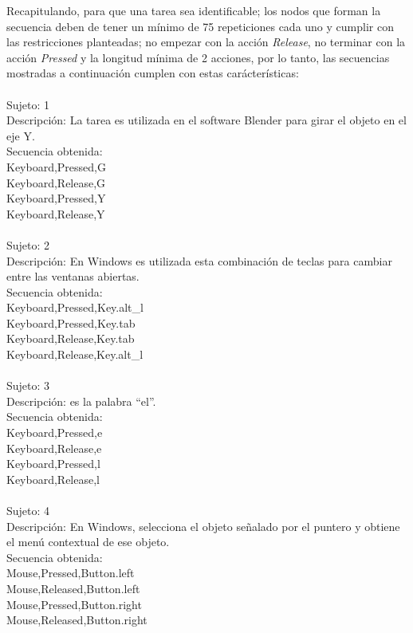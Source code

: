 Recapitulando, para que una tarea sea identificable; los nodos que forman la
 secuencia deben de tener un m\'inimo de 75 repeticiones cada uno y cumplir 
 con las restricciones planteadas; no empezar con la acci\'on \emph{Release}, 
 no terminar con la acci\'on \emph{Pressed} y la longitud m\'inima de 
 2 acciones, por lo tanto, las secuencias mostradas a continuaci\'on
 cumplen con estas car\'acter\'isticas:
\\
\\
Sujeto: 1	\\
Descripci\'on: La tarea es utilizada en el software Blender para girar el 
 objeto en el eje Y.	\\
Secuencia obtenida:\\
Keyboard,Pressed,G\\
Keyboard,Release,G\\
Keyboard,Pressed,Y\\
Keyboard,Release,Y\\
\\
Sujeto: 2	\\
Descripci\'on: En Windows es utilizada esta combinaci\'on de teclas para 
 cambiar entre las ventanas abiertas.	\\
Secuencia obtenida:\\
Keyboard,Pressed,Key.alt\_l	\\
Keyboard,Pressed,Key.tab	\\
Keyboard,Release,Key.tab	\\
Keyboard,Release,Key.alt\_l	\\
\\
Sujeto: 3	\\
Descripci\'on: es la palabra ``el''.	\\
Secuencia obtenida:\\
Keyboard,Pressed,e	\\
Keyboard,Release,e	\\
Keyboard,Pressed,l	\\
Keyboard,Release,l	\\
\\
Sujeto: 4	\\
Descripci\'on: En Windows, selecciona el objeto se\~nalado por el puntero y
 obtiene el men\'u contextual de ese objeto.	\\
Secuencia obtenida:\\	
Mouse,Pressed,Button.left	\\
Mouse,Released,Button.left	\\
Mouse,Pressed,Button.right	\\
Mouse,Released,Button.right	\\
